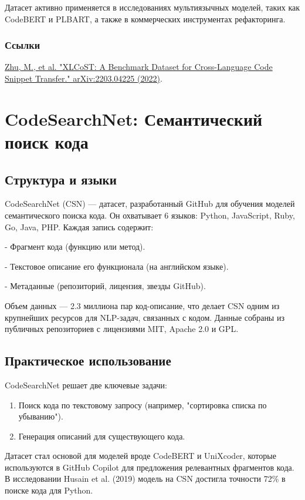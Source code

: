 \documentclass[14pt]{article}
\theoremstyle{definition}
\begin{document}
Датасет активно применяется в исследованиях мультиязычных моделей, таких как CodeBERT и PLBART, а также в коммерческих инструментах рефакторинга.

\subsubsection*{Ссылки}
\href{https://arxiv.org/abs/2203.04225}{Zhu, M., et al. "XLCoST: A Benchmark Dataset for Cross-Language Code Snippet Transfer." arXiv:2203.04225 (2022)}.

\newpage

\section{CodeSearchNet: Семантический поиск кода}

\subsection{Структура и языки}
CodeSearchNet (CSN) — датасет, разработанный GitHub для обучения моделей семантического поиска кода. Он охватывает 6 языков: Python, JavaScript, Ruby, Go, Java, PHP. Каждая запись содержит:

    
- Фрагмент кода (функцию или метод).
    
- Текстовое описание его функционала (на английском языке).
    
- Метаданные (репозиторий, лицензия, звезды GitHub).


Объем данных — 2.3 миллиона пар код-описание, что делает CSN одним из крупнейших ресурсов для NLP-задач, связанных с кодом. Данные собраны из публичных репозиториев с лицензиями MIT, Apache 2.0 и GPL.

\subsection{Практическое использование}
CodeSearchNet решает две ключевые задачи:
\begin{enumerate}
    \item Поиск кода по текстовому запросу (например, "сортировка списка по убыванию").
    \item Генерация описаний для существующего кода.
\end{enumerate}

Датасет стал основой для моделей вроде CodeBERT и UniXcoder, которые используются в GitHub Copilot для предложения релевантных фрагментов кода. В исследовании Husain et al. (2019) модель на CSN достигла точности 72\% в поиске кода для Python.
\end{document}
